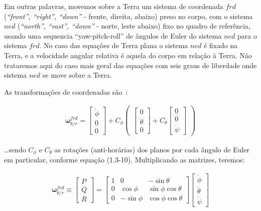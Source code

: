 Em outras palavras, movemos sobre a Terra um sistema de coordenada \(frd\) (\emph{``front'', ``right'', ``down''} - frente, direita, abaixo) preso no corpo, com o sistema \(ned\) (\emph{``north'', ``east'', ``down''} - norte, leste abaixo) fixo no quadro de referência, usando uma sequencia ``yaw-pitch-roll'' de ângulos de Euler do sistema \(ned\) para o sistema \(frd\). No caso das equações de Terra plana o sistema \(ned\) é fixado na Terra, e a velocidade angular relativa é aquela do corpo em relação à Terra. Não trataremos aqui do caso mais geral das equações com seis graus de liberdade onde sistema \(ned\) se move sobre a Terra.

As transformações de coordenadas são~\cite{Stevens2016}:

\begin{align*}
    \mathbf{\omega}^{frd}_{b/r} = \begin{bmatrix} \dot\phi \\ 0 \\0 \end{bmatrix}
    + C_{\phi} \begin{pmatrix}
        \begin{bmatrix} 0 \\ \dot\theta \\ 0 \end{bmatrix}
        + C_{\theta}\begin{bmatrix} 0 \\ 0 \\ \dot\psi \end{bmatrix}
    \end{pmatrix}
\end{align*}

\ldots sendo \(C_{\phi}\) e \(C_{\theta}\)  as rotações (anti-horárias) dos planos por cada ângulo de Euler em particular, conforme equação (1.3-10). Multiplicando as matrizes, teremos:

\begin{align} \tag{1.4-3}
    \mathbf{\omega}^{frd}_{b/r} \equiv \begin{bmatrix} P \\ Q \\ R \end{bmatrix}
    = \begin{bmatrix}
        1 & 0 & -\sin{\theta} \\
        0 & \cos{\phi} & \sin{\phi}\cos{\theta} \\
        0 & -\sin{\phi} & \cos{\phi}\cos{\theta}
    \end{bmatrix}
    \begin{bmatrix}
        \dot\phi \\
        \dot\theta \\
        \dot\psi
    \end{bmatrix}
\end{align}

